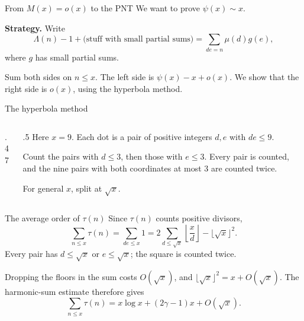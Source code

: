 \documentclass[aspectratio=169,11pt]{beamer}
\begin{document}
\begin{frame}{From $M(x)=o(x)$ to the PNT}
We want to prove $\psi(x)\sim x$.

\textbf{Strategy.} Write
\[\Lambda(n)-1+\text{(stuff with small partial sums)}
=\sum_{de=n}\mu(d)g(e),\]
where $g$ has small partial sums.

Sum both sides on $n\le x$. The left side is $\psi(x)-x+o(x)$. We show that the right side is $o(x)$, using the hyperbola method.
\end{frame}
\begin{frame}{The hyperbola method}
\begin{columns}[c]
\begin{column}{.47\textwidth}
\end{column}
\begin{column}{.5\textwidth}
Here $x=9$. Each dot is a pair of positive integers $d,e$ with $de\le9$.

Count the pairs with $d\le3$, then those with $e\le3$. Every pair is counted, and the nine pairs with both coordinates at most $3$ are counted twice.

For general $x$, split at $\sqrt x$.
\end{column}\end{columns}
\end{frame}
\begin{frame}{The average order of $\tau(n)$}
Since $\tau(n)$ counts positive divisors,
\[\sum_{n\le x}\tau(n)=\sum_{de\le x}1
=2\sum_{d\le\sqrt x}\left\lfloor\frac xd\right\rfloor-\lfloor\sqrt x\rfloor^2.\]
Every pair has $d\le\sqrt x$ or $e\le\sqrt x$; the square is counted twice.

Dropping the floors in the sum costs $O(\sqrt x)$, and $\lfloor\sqrt x\rfloor^2=x+O(\sqrt x)$. The harmonic-sum estimate therefore gives
\[\sum_{n\le x}\tau(n)=x\log x+(2\gamma-1)x+O(\sqrt x).\]
\end{frame}
\end{document}
